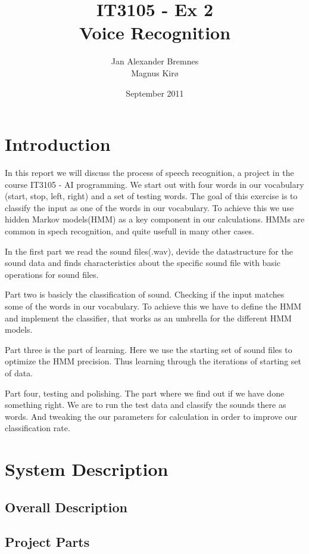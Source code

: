 \documentclass[titlepage]{article}
\author{Jan Alexander Bremnes\\Magnus Kirø}
\title{IT3105 - Ex 2\\Voice Recognition}
\date{September 2011}
\begin{document}
    \maketitle
    \tableofcontents
    \newpage

\section{Introduction}
In this report we will discuss the process of speech recognition, a project in the course IT3105 - AI programming. We start out with four words in our vocabulary (start, stop, left, right) and a set of testing words. The goal of this exercise is to classify the input as one of the words in our vocabulary. To achieve this we use hidden Markov models(HMM) as a key component in our calculations. HMMs are common in spech recognition, and quite usefull in many other cases. 

In the first part we read the sound files(.wav), devide the datastructure for the sound data and finds characteristics about the specific sound file with basic operations for sound files. 

Part two is basicly the classification of sound. Checking if the input matches some of the words in our vocabulary. To achieve this we have to define the HMM and implement the classifier, that works as an umbrella for the different HMM models. 

Part three is the part of learning. Here we use the starting set of sound files to optimize the HMM precision. Thus learning through the iterations of starting set of data. 

Part four, testing and polishing. The part where we find out if we have done something right. We are to run the test data and classify the sounds there as words. And tweaking the our parameters for calculation in order to improve our classification rate.  

\section{System Description}

\subsection{Overall Description}

\subsection{Project Parts}
\end{document}
